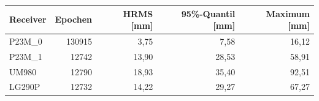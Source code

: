 \documentclass[11pt,a4paper]{article}
\numberwithin{equation}{section}
\numberwithin{figure}{section}
\begin{document}
\begin{center}\begin{lrbox}{\reporttable}\small\setlength{\tabcolsep}{4pt}\begin{tabular}{lrrrr}\toprule
Receiver & Epochen & HRMS [mm] & 95\%-Quantil [mm] & Maximum [mm]\\\midrule
P23M\_0 & 130915 & 3,75 & 7,58 & 16,12\\
P23M\_1 & 12742 & 13,90 & 28,53 & 58,91\\
UM980 & 12790 & 18,93 & 35,40 & 92,51\\
LG290P & 12732 & 14,22 & 29,27 & 67,27\\
\bottomrule\end{tabular}\end{lrbox}\ifdim\wd\reporttable>\linewidth\resizebox{\linewidth}{!}{\usebox{\reporttable}}\else\usebox{\reporttable}\fi\end{center}
\end{document}
